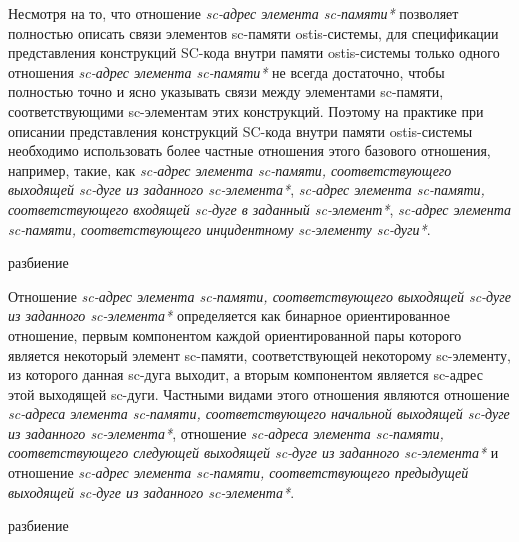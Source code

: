 Несмотря на то, что отношение \textit{sc-адрес элемента sc-памяти*} позволяет полностью описать связи элементов sc-памяти ostis-системы, для спецификации представления конструкций SC-кода внутри памяти ostis-системы только одного отношения \textit{sc-адрес элемента sc-памяти*} не всегда достаточно, чтобы полностью точно и ясно указывать связи между элементами sc-памяти, соответствующими sc-элементам этих конструкций. Поэтому на практике при описании представления конструкций SC-кода внутри памяти ostis-системы необходимо использовать более частные отношения этого базового отношения, например, такие, как \textit{sc-адрес элемента sc-памяти, соответствующего выходящей sc-дуге из заданного sc-элемента*}, \textit{sc-адрес элемента sc-памяти, соответствующего входящей sc-дуге в заданный sc-элемент*}, \textit{sc-адрес элемента sc-памяти, соответствующего инцидентному sc-элементу sc-дуги*}.

\begin{SCn}
\begin{scnrelfromset}{разбиение}
\end{scnrelfromset}
\end{SCn}

Отношение \textit{sc-адрес элемента sc-памяти, соответствующего выходящей sc-дуге из заданного sc-элемента*} определяется как бинарное ориентированное отношение, первым компонентом каждой ориентированной пары которого является некоторый элемент sc-памяти, соответствующей некоторому sc-элементу, из которого данная sc-дуга выходит, а вторым компонентом является sc-адрес этой выходящей sc-дуги. Частными видами этого отношения являются отношение \textit{sc-адреса элемента sc-памяти, соответствующего начальной выходящей sc-дуге из заданного sc-элемента*}, отношение \textit{sc-адреса элемента sc-памяти, соответствующего следующей выходящей sc-дуге из заданного sc-элемента*} и отношение \textit{sc-адрес элемента sc-памяти, соответствующего предыдущей выходящей sc-дуге из заданного sc-элемента*}.

\begin{SCn}
\begin{scnrelfromset}{разбиение}
\end{scnrelfromset}
\end{SCn}


